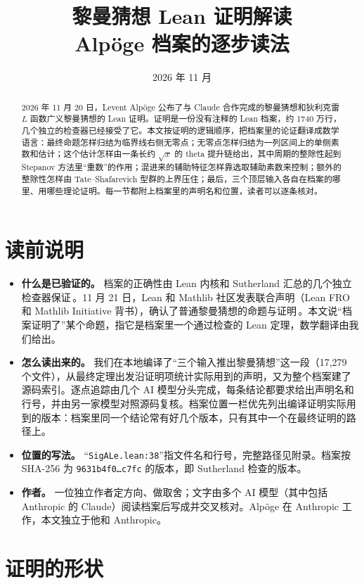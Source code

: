 \documentclass[11pt]{article}
\title{\textsf{黎曼猜想 Lean 证明解读}\\[4pt]\large Alpöge 档案的逐步读法}
\date{2026 年 11 月}
\author{}
\newcommand{\Lean}[1]{\texttt{\small #1}}
\begin{document}
\maketitle

\begin{abstract}
2026 年 11 月 20 日，Levent Alpöge 公布了与 Claude 合作完成的黎曼猜想和狄利克雷 $L$ 函数广义黎曼猜想的 Lean 证明。证明是一份没有注释的 Lean 档案，约 1740 万行，几个独立的检查器已经接受了它。本文按证明的逻辑顺序，把档案里的论证翻译成数学语言：最终命题怎样归结为临界线右侧无零点；无零点怎样归结为一列区间上的单侧素数和估计；这个估计怎样由一条长约 $\sqrt x$ 的 theta 提升链给出，其中周期的整除性起到 Stepanov 方法里“重数”的作用；混进来的辅助特征怎样靠选取辅助素数来控制；额外的整除性怎样由 Tate–Shafarevich 型群的上界压住；最后，三个顶层输入各自在档案的哪里、用哪些理论证明。每一节都附上档案里的声明名和位置，读者可以逐条核对。
\end{abstract}

\section*{读前说明}
\begin{itemize}
\item \textbf{什么是已验证的。} 档案的正确性由 Lean 内核和 Sutherland 汇总的几个独立检查器保证\,\cite{sutherland}。11 月 21 日，Lean 和 Mathlib 社区发表联合声明（Lean FRO 和 Mathlib Initiative 背书），确认了普通黎曼猜想的命题与证明\,\cite{leanfro}。本文说“档案证明了”某个命题，指它是档案里一个通过检查的 Lean 定理，数学翻译由我们给出。
\item \textbf{怎么读出来的。} 我们在本地编译了“三个输入推出黎曼猜想”这一段（17{,}279 个文件），从最终定理出发沿证明项统计实际用到的声明，又为整个档案建了源码索引。逐点追踪由几个 AI 模型分头完成，每条结论都要求给出声明名和行号，并由另一家模型对照源码复核。档案位置一栏优先列出编译证明实际用到的版本：档案里同一个结论常有好几个版本，只有其中一个在最终证明的路径上。
\item \textbf{位置的写法。} “\Lean{SigALe.lean:38}”指文件名和行号，完整路径见附录。档案按 SHA-256 为 \Lean{9631b4f0\ldots c7fc} 的版本，即 Sutherland 检查的版本。
\item \textbf{作者。} 一位独立作者定方向、做取舍；文字由多个 AI 模型（其中包括 Anthropic 的 Claude）阅读档案后写成并交叉核对。Alpöge 在 Anthropic 工作，本文独立于他和 Anthropic。
\end{itemize}

\section*{证明的形状}\label{sec:shape}
\end{document}
